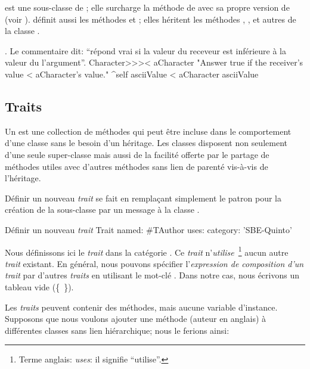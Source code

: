 \documentclass[a4paper,10pt,twoside]{book}
\begin{document}
 est une sous-classe de ; elle surcharge la m\'ethode  de \ct{<} avec sa propre version de \ct{<} (voir ).   d\'efinit aussi les m\'ethodes \ct{=} et ; elles h\'eritent les m\'ethodes \ct{>=}, \ct{<=}, \ct{~=} et autres de la classe .

\begin{method}[CharacterLessThan]{. Le commentaire dit: ``r\'epond vrai si la valeur du receveur est inf\'erieure \`a la valeur du l'argument''.}
Character>>>< aCharacter 
	"Answer true if the receiver's value < aCharacter's value."
	^self asciiValue < aCharacter asciiValue
\end{method}

\subsection{Traits}
Un  est une collection de m\'ethodes qui peut \^etre incluse dans le comportement d'une classe sans le besoin d'un h\'eritage.
Les classes disposent non seulement d'une seule super-classe mais aussi de la facilit\'e offerte par le partage de m\'ethodes utiles avec d'autres m\'ethodes sans lien de parent\'e vis-\`a-vis de l'h\'eritage.

D\'efinir un nouveau \emph{trait} se fait en rempla\c{c}ant simplement le patron
pour la cr\'eation de la sous-classe par un message \`a la classe .

\begin{classdef}[tauthor]{D\'efinir un nouveau \emph{trait}}
Trait named: #TAuthor
	uses: { }
	category: 'SBE-Quinto'
\end{classdef}

\noindent
Nous d\'efinissons ici le \emph{trait}  dans la cat\'egorie .
Ce \emph{trait} n'\emph{utilise}~\footnote{Terme anglais: \emph{uses}: il signifie ``utilise''.} aucun autre \emph{trait} existant.
En g\'en\'eral, nous pouvons sp\'ecifier l'\emph{expression de composition d'un trait} par d'autres \emph{traits} en u\-ti\-li\-sant le mot-cl\'e .
Dans notre cas, nous \'ecrivons un tableau vide \mbox{(\{ \}).}

Les \emph{traits} peuvent contenir des m\'ethodes, mais aucune variable d'instance.
Supposons que nous voulons ajouter une m\'ethode  (auteur en anglais) \`a diff\'erentes classes sans lien hi\'erarchique;
nous le ferions ainsi:
\end{document}
